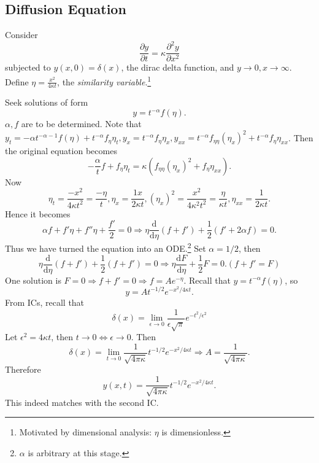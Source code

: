 \documentclass[a4paper]{article}
\begin{document}
      \subsection{Diffusion Equation}
      \begin{example}
          Consider 
          \[
              \frac{\partial y}{\partial t} = \kappa \frac{\partial^2 y}{\partial x^2}  
          \]
          subjected to $ y(x,0)=\delta(x) $, the dirac delta function, and $ y\to 0, x\to \infty $. Define $ \eta=\frac{x^2}{4\kappa t} $, the \textit{similarity variable}.\footnote{Motivated by dimensional analysis: $\eta$ is dimensionless.}

          Seek solutions of form
          \[
              y=t^{-\alpha}f(\eta).
          \]
          $\alpha,f$ are to be determined. Note that $ y_t=-\alpha t^{-\alpha-1}f(\eta)+t^{-\alpha}f_{\eta}\eta_t, y_x=t^{-\alpha}f_{\eta}\eta_x, y_{xx}=t^{-\alpha}f_{\eta \eta}(\eta_x)^2+t^{-\alpha}f_{\eta}\eta_{xx}$. Then the original equation becomes 
          \[
              -\frac{\alpha}{t}f+f_{\eta}\eta_t=\kappa(f_{\eta \eta}(\eta_x)^2+f_\eta \eta_{xx}).
          \]
          Now 
          \[
              \eta_t = \frac{-x^2}{4\kappa t^2} = \frac{-\eta}{t}, \eta_x = \frac{1x}{2\kappa t}, (\eta_x)^2 = \frac{x^2}{4\kappa^2 t^2}= \frac{\eta}{\kappa t}, \eta_{xx}=\frac{1}{2\kappa t}.
          \]
          Hence it becomes 
          \[
              \alpha f+f'\eta+f''\eta+\frac{f'}{2}=0 \Longrightarrow \eta \frac{\mathrm{d}}{\mathrm{d}\eta}\left( f+f' \right) +\frac{1}{2}(f'+2\alpha f)=0.
          \]
          Thus we have turned the equation into an ODE.\footnote{$ \alpha $ is arbitrary at this stage.} Set $ \alpha=1/2 $, then 
          \[
            \eta \frac{\mathrm{d}}{\mathrm{d}\eta}\left( f+f' \right) +\frac{1}{2}(f+f')=0 \Longrightarrow \eta \frac{\mathrm{d}F}{\mathrm{d}\eta} +\frac{1}{2}F=0.(f+f'=F)
          \]
          One solution is $ F=0 \Rightarrow f+f'=0 \Rightarrow f=Ae^{-\eta} $. Recall that $ y=t^{-\alpha}f(\eta) $, so 
          \[
              y=A t^{-1/2}e^{-x^2/4\kappa t}.
          \]
          From ICs, recall that 
          \[
              \delta(x)=\lim_{\epsilon \to 0} \frac{1}{\epsilon\sqrt{\pi}}e^{-t^2/\epsilon^2}
          \]
        Let $ \epsilon^2=4 \kappa t $, then $ t\to 0 \Leftrightarrow \epsilon\to 0 $. Then 
        \[
            \delta(x)=\lim_{t \to 0} \frac{1}{\sqrt{4\pi \kappa}}t^{-1/2}e^{-x^2/4\kappa t} \Longrightarrow A=\frac{1}{\sqrt{4\pi \kappa}}.
        \]
        Therefore 
        \[
            y(x,t)=\frac{1}{\sqrt{4\pi \kappa}}t^{-1/2}e^{-x^2/4\kappa t}.
        \]
        This indeed matches with the second IC.
      \end{example}
\end{document}
